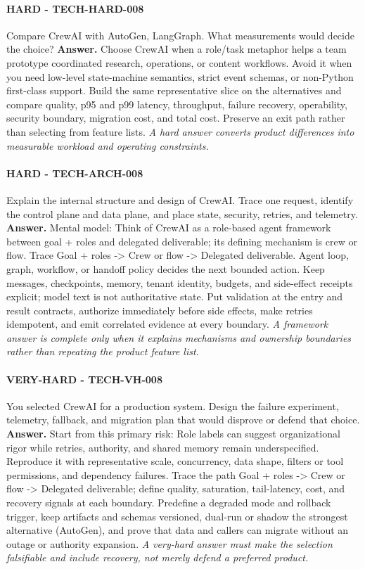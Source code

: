 \paragraph{HARD - TECH-HARD-008} Compare CrewAI with AutoGen, LangGraph. What measurements would decide the choice?
\textbf{Answer.} Choose CrewAI when a role/task metaphor helps a team prototype coordinated research, operations, or content workflows. Avoid it when you need low-level state-machine semantics, strict event schemas, or non-Python first-class support. Build the same representative slice on the alternatives and compare quality, p95 and p99 latency, throughput, failure recovery, operability, security boundary, migration cost, and total cost. Preserve an exit path rather than selecting from feature lists.
\textit{A hard answer converts product differences into measurable workload and operating constraints.}
\paragraph{HARD - TECH-ARCH-008} Explain the internal structure and design of CrewAI. Trace one request, identify the control plane and data plane, and place state, security, retries, and telemetry.
\textbf{Answer.} Mental model: Think of CrewAI as a role-based agent framework between goal + roles and delegated deliverable; its defining mechanism is crew or flow. Trace Goal + roles -> Crew or flow -> Delegated deliverable. Agent loop, graph, workflow, or handoff policy decides the next bounded action. Keep messages, checkpoints, memory, tenant identity, budgets, and side-effect receipts explicit; model text is not authoritative state. Put validation at the entry and result contracts, authorize immediately before side effects, make retries idempotent, and emit correlated evidence at every boundary.
\textit{A framework answer is complete only when it explains mechanisms and ownership boundaries rather than repeating the product feature list.}
\paragraph{VERY-HARD - TECH-VH-008} You selected CrewAI for a production system. Design the failure experiment, telemetry, fallback, and migration plan that would disprove or defend that choice.
\textbf{Answer.} Start from this primary risk: Role labels can suggest organizational rigor while retries, authority, and shared memory remain underspecified. Reproduce it with representative scale, concurrency, data shape, filters or tool permissions, and dependency failures. Trace the path Goal + roles -> Crew or flow -> Delegated deliverable; define quality, saturation, tail-latency, cost, and recovery signals at each boundary. Predefine a degraded mode and rollback trigger, keep artifacts and schemas versioned, dual-run or shadow the strongest alternative (AutoGen), and prove that data and callers can migrate without an outage or authority expansion.
\textit{A very-hard answer must make the selection falsifiable and include recovery, not merely defend a preferred product.}
